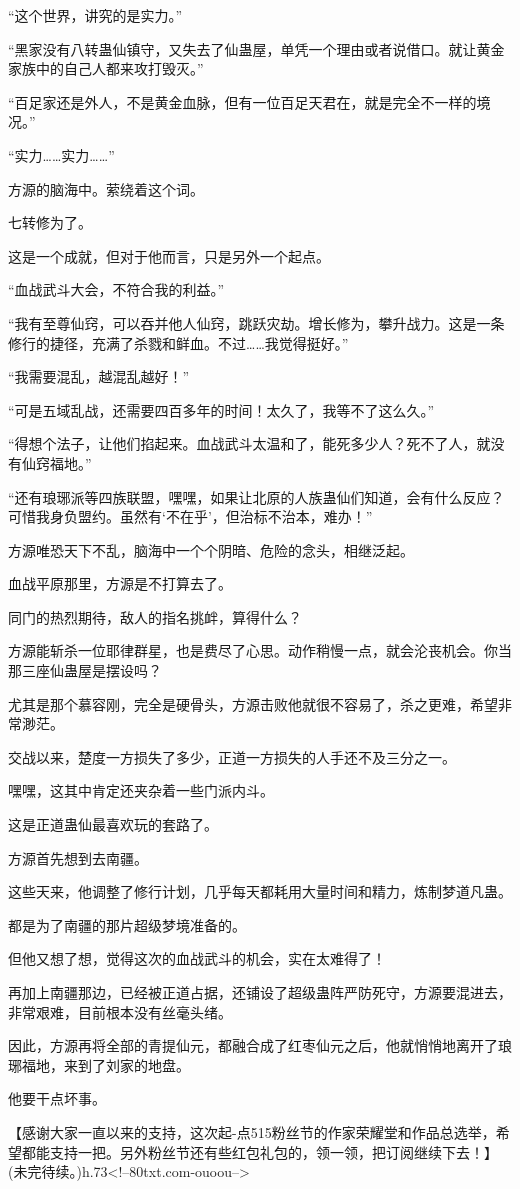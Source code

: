 \begin{this_body}
“这个世界，讲究的是实力。”

“黑家没有八转蛊仙镇守，又失去了仙蛊屋，单凭一个理由或者说借口。就让黄金家族中的自己人都来攻打毁灭。”

“百足家还是外人，不是黄金血脉，但有一位百足天君在，就是完全不一样的境况。”

“实力……实力……”

方源的脑海中。萦绕着这个词。

七转修为了。

这是一个成就，但对于他而言，只是另外一个起点。

“血战武斗大会，不符合我的利益。”

“我有至尊仙窍，可以吞并他人仙窍，跳跃灾劫。增长修为，攀升战力。这是一条修行的捷径，充满了杀戮和鲜血。不过……我觉得挺好。”

“我需要混乱，越混乱越好！”

“可是五域乱战，还需要四百多年的时间！太久了，我等不了这么久。”

“得想个法子，让他们掐起来。血战武斗太温和了，能死多少人？死不了人，就没有仙窍福地。”

“还有琅琊派等四族联盟，嘿嘿，如果让北原的人族蛊仙们知道，会有什么反应？可惜我身负盟约。虽然有‘不在乎’，但治标不治本，难办！”

方源唯恐天下不乱，脑海中一个个阴暗、危险的念头，相继泛起。

血战平原那里，方源是不打算去了。

同门的热烈期待，敌人的指名挑衅，算得什么？

方源能斩杀一位耶律群星，也是费尽了心思。动作稍慢一点，就会沦丧机会。你当那三座仙蛊屋是摆设吗？

尤其是那个慕容刚，完全是硬骨头，方源击败他就很不容易了，杀之更难，希望非常渺茫。

交战以来，楚度一方损失了多少，正道一方损失的人手还不及三分之一。

嘿嘿，这其中肯定还夹杂着一些门派内斗。

这是正道蛊仙最喜欢玩的套路了。

方源首先想到去南疆。

这些天来，他调整了修行计划，几乎每天都耗用大量时间和精力，炼制梦道凡蛊。

都是为了南疆的那片超级梦境准备的。

但他又想了想，觉得这次的血战武斗的机会，实在太难得了！

再加上南疆那边，已经被正道占据，还铺设了超级蛊阵严防死守，方源要混进去，非常艰难，目前根本没有丝毫头绪。

因此，方源再将全部的青提仙元，都融合成了红枣仙元之后，他就悄悄地离开了琅琊福地，来到了刘家的地盘。

他要干点坏事。

【感谢大家一直以来的支持，这次起-点515粉丝节的作家荣耀堂和作品总选举，希望都能支持一把。另外粉丝节还有些红包礼包的，领一领，把订阅继续下去！】(未完待续。)h.73<!--80txt.com-ouoou-->

\end{this_body}

